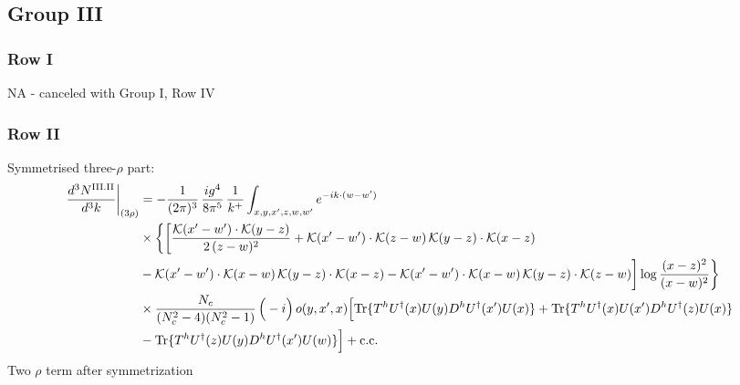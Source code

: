 \documentclass[9pt]{article}
\numberwithin{equation}{section}
\begin{document}
\subsection{Group III}
\subsubsection*{Row I}
\textsc{NA} - canceled with Group I, Row IV
\subsubsection*{Row II}
Symmetrised three-$\rho$ part:
\begin{align}
\frac{d^{3}N^{\rm III.II}}{d^{3}k}\bigg|_{(3\rho)}&=-\frac{1}{(2\pi)^{3}}\,\frac{ig^{4}}{8\pi^{5}}\,\frac{1}{k^{+}}\int_{x,y,x',z,w,w'}e^{-ik\cdot(w-w')}\notag\\
&\times\bigg\{\bigg[\frac{\mathcal{K}(x'-w')\cdot\mathcal{K}(y-z)}{2\,(z-w)^{2}}+\mathcal{K}(x'-w')\cdot\mathcal{K}(z-w)\,\mathcal{K}(y-z)\cdot\mathcal{K}(x-z)\notag\\
&-\mathcal{K}(x'-w')\cdot\mathcal{K}(x-w)\,\mathcal{K}(y-z)\cdot\mathcal{K}(x-z)-\mathcal{K}(x'-w')\cdot\mathcal{K}(x-w)\,\mathcal{K}(y-z)\cdot\mathcal{K}(z-w)\bigg]\log\frac{(x-z)^{2}}{(x-w)^{2}}\bigg\}\notag\\
&\times \frac{N_{c}}{(N_{c}^{2}-4)(N_{c}^{2}-1)}\,\Big(-i\Big)\,o(y,x',x)\Big[{\rm Tr}\{T^{h}U^{\dagger}(x)U(y)D^{h}U^{\dagger}(x')U(x)\}+{\rm Tr}\{T^{h}U^{\dagger}(x)U(x')D^{h}U^{\dagger}(z)U(x)\}\notag\\
& -{\rm Tr}\{T^{h}U^{\dagger}(z)U(y)D^{h}U^{\dagger}(x')U(w)\}\Big]+{\rm c.c.}\label{eq:E-III.II-3}
\end{align}
Two $\rho$ term after symmetrization
\end{document}
